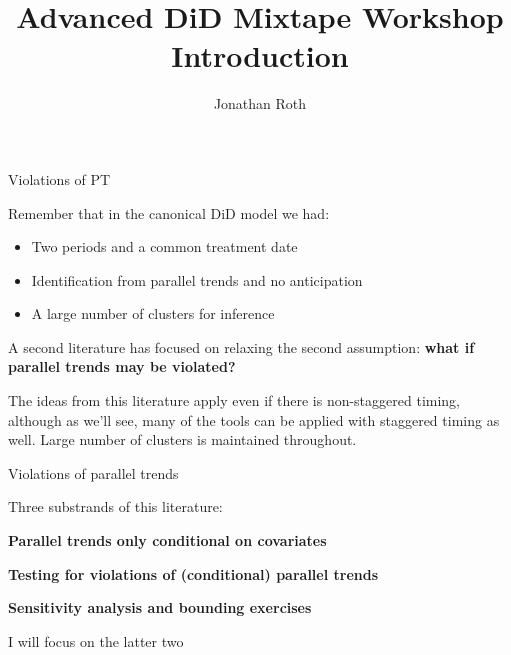 \documentclass[aspectratio = 169, 13pt]{beamer}
\author{Jonathan Roth}
\title[Advanced DiD Mixtape Workshop]{Advanced DiD Mixtape Workshop \\ Introduction}
\begin{document}

\begin{frame}{Violations of PT}
	\addtocounter{framenumber}{-1}
	\begin{wideitemize}
		\item
		Remember that in the canonical DiD model we had:
		
		\begin{itemize}
			\item 
			Two periods and a common treatment date
			
			\item
			Identification from parallel trends and no anticipation
			
			\item
			A large number of clusters for inference
		\end{itemize}
		
		\item
		A second literature has focused on relaxing the second assumption: \textbf{what if parallel trends may be violated?}
		
		\item
		The ideas from this literature apply even if there is non-staggered timing, although as we'll see, many of the tools can be applied with staggered timing as well. Large number of clusters is maintained throughout. 
		
	\end{wideitemize}
	
\end{frame}




\begin{frame}{Violations of parallel trends}
	\begin{wideitemize}
		
		
		\item
		Three substrands of this literature: \\
		\medskip 
		\begin{wideitemize}
			
			{\normalsize
				\item
				\textbf{Parallel trends only conditional on covariates} \\
				
				\item
				\textbf{Testing for violations of (conditional) parallel trends}\\
				
				\item
				\textbf{Sensitivity analysis and bounding exercises}
			}
			
		\end{wideitemize}
		
		\item
		I will focus on the latter two
		
	\end{wideitemize}
\end{frame}
\end{document}
